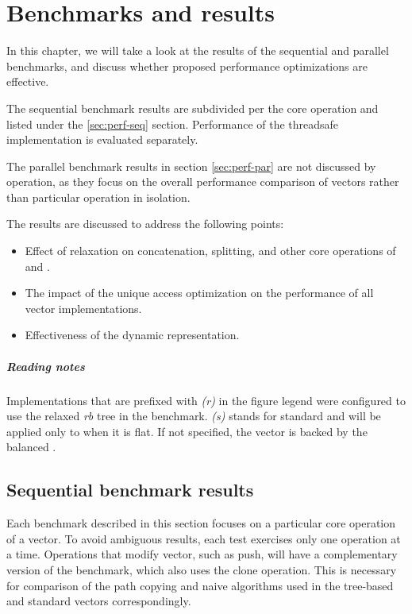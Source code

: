 \newcommand{\balanced}{}
\newcommand{\standard}{\emph{(s)}}
\newcommand{\relaxed}{\emph{(r)}}

\chapter{Benchmarks and results}
In this chapter, we will take a look at the results of the sequential and parallel benchmarks, and discuss whether proposed performance optimizations are effective.

The sequential benchmark results are subdivided per the core operation and listed under the \ref{sec:perf-seq} section. Performance of the threadsafe implementation is evaluated separately.

The parallel benchmark results in section \ref{sec:perf-par} are not discussed by operation, as they focus on the overall performance comparison of vectors rather than particular operation in isolation.

The results are discussed to address the following points:
\begin{itemize}
    \item Effect of \rrbtree{} relaxation on concatenation, splitting, and other core operations of \rrbvec{} and \pvec{}.
    \item The impact of the unique access optimization on the performance of all vector implementations.
    \item Effectiveness of the dynamic representation.
\end{itemize}

\paragraph{Reading notes}
Implementations that are prefixed with \relaxed{} in the figure legend were configured to use the relaxed \emph{rb} tree in the benchmark. \standard{} stands for standard and will be applied only to \pvec{} when it is flat. If not specified, the vector is backed by the balanced \rbtree{}.

\section{Sequential benchmark results}
Each benchmark described in this section focuses on a particular core operation of a vector. To avoid ambiguous results, each test exercises only one operation at a time. Operations that modify vector, such as push, will have a complementary version of the benchmark, which also uses the clone operation. This is necessary for comparison of the path copying and naive algorithms used in the tree-based and standard vectors correspondingly.

